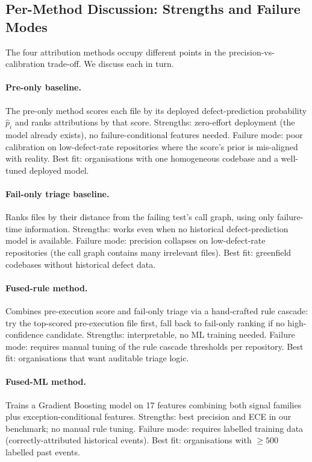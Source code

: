 \documentclass[11pt,a4paper]{article}
\begin{document}
\subsection{Per-Method Discussion: Strengths and Failure Modes}
\label{sec:per_method_discussion}

The four attribution methods occupy different points in the precision-vs-calibration trade-off. We discuss each in turn.

\paragraph{Pre-only baseline.} The pre-only method scores each file by its deployed defect-prediction probability $\hat{p}_i$ and ranks attributions by that score. Strengths: zero-effort deployment (the model already exists), no failure-conditional features needed. Failure mode: poor calibration on low-defect-rate repositories where the score's prior is mis-aligned with reality. Best fit: organisations with one homogeneous codebase and a well-tuned deployed model.

\paragraph{Fail-only triage baseline.} Ranks files by their distance from the failing test's call graph, using only failure-time information. Strengths: works even when no historical defect-prediction model is available. Failure mode: precision collapses on low-defect-rate repositories (the call graph contains many irrelevant files). Best fit: greenfield codebases without historical defect data.

\paragraph{Fused-rule method.} Combines pre-execution score and fail-only triage via a hand-crafted rule cascade: try the top-scored pre-execution file first, fall back to fail-only ranking if no high-confidence candidate. Strengths: interpretable, no ML training needed. Failure mode: requires manual tuning of the rule cascade thresholds per repository. Best fit: organisations that want auditable triage logic.

\paragraph{Fused-ML method.} Trains a Gradient Boosting model on 17 features combining both signal families plus exception-conditional features. Strengths: best precision and ECE in our benchmark; no manual rule tuning. Failure mode: requires labelled training data (correctly-attributed historical events). Best fit: organisations with $\geq 500$ labelled past events.
\end{document}
